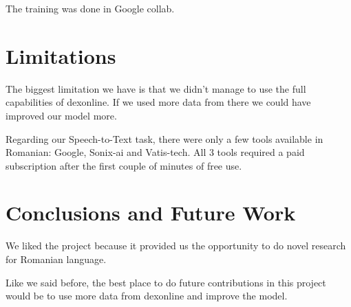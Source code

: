 \documentclass[11pt]{article}
\begin{document}
The training was done in Google collab.

\section{Limitations}
\label{section:limitations}
The biggest limitation we have is that we didn't manage to use the full capabilities of dexonline. If we used more data from there we could have improved our model more.

Regarding our Speech-to-Text task, there were only a few tools available in Romanian: Google, Sonix-ai and Vatis-tech. All 3 tools required a paid subscription after the first couple of minutes of free use.

\section{Conclusions and Future Work}
\label{section:conclusions}
We liked the project because it provided us the opportunity to do novel research for Romanian language.

Like we said before, the best place to do future contributions in this project would be to use more data from dexonline and improve the model.
\end{document}
